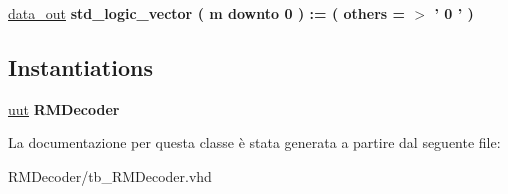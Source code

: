 \begin{DoxyCompactItemize}
\item 
\hypertarget{classtb___r_m_decoder_1_1_behavioral_ga0bdb7fe05ee2f31a8225c058816320c7}{\hyperlink{group___r_m_decoder_ga0bdb7fe05ee2f31a8225c058816320c7}{data\+\_\+out} {\bfseries \textcolor{comment}{std\+\_\+logic\+\_\+vector}\textcolor{vhdlchar}{ }\textcolor{vhdlchar}{(}\textcolor{vhdlchar}{ }\textcolor{vhdlchar}{ }\textcolor{vhdlchar}{ }\textcolor{vhdlchar}{ }\textcolor{vhdlchar}{m}\textcolor{vhdlchar}{ }\textcolor{keywordflow}{downto}\textcolor{vhdlchar}{ }\textcolor{vhdlchar}{ } \textcolor{vhdldigit}{0} \textcolor{vhdlchar}{ }\textcolor{vhdlchar}{)}\textcolor{vhdlchar}{ }\textcolor{vhdlchar}{ }\textcolor{vhdlchar}{ }\textcolor{vhdlchar}{\+:}\textcolor{vhdlchar}{=}\textcolor{vhdlchar}{ }\textcolor{vhdlchar}{(}\textcolor{vhdlchar}{ }\textcolor{vhdlchar}{ }\textcolor{keywordflow}{others}\textcolor{vhdlchar}{ }\textcolor{vhdlchar}{ }\textcolor{vhdlchar}{=}\textcolor{vhdlchar}{ }\textcolor{vhdlchar}{$>$}\textcolor{vhdlchar}{ }\textcolor{vhdlchar}{'}\textcolor{vhdlchar}{ } \textcolor{vhdldigit}{0} \textcolor{vhdlchar}{ }\textcolor{vhdlchar}{'}\textcolor{vhdlchar}{ }\textcolor{vhdlchar}{)}\textcolor{vhdlchar}{ }} }\label{classtb___r_m_decoder_1_1_behavioral_ga0bdb7fe05ee2f31a8225c058816320c7}

\end{DoxyCompactItemize}
\subsection*{Instantiations}
 \begin{DoxyCompactItemize}
\item 
\hypertarget{classtb___r_m_decoder_1_1_behavioral_a1619316ad715601eb5d3559db829ac05}{\hyperlink{classtb___r_m_decoder_1_1_behavioral_a1619316ad715601eb5d3559db829ac05}{uut}  {\bfseries R\+M\+Decoder}   }\label{classtb___r_m_decoder_1_1_behavioral_a1619316ad715601eb5d3559db829ac05}

\end{DoxyCompactItemize}


La documentazione per questa classe è stata generata a partire dal seguente file\+:\begin{DoxyCompactItemize}
\item 
R\+M\+Decoder/tb\+\_\+\+R\+M\+Decoder.\+vhd\end{DoxyCompactItemize}
